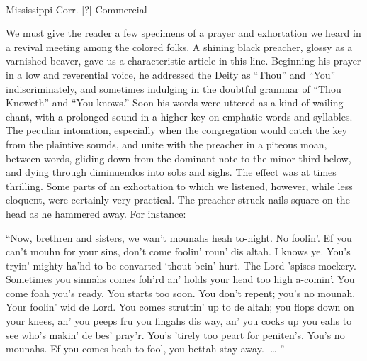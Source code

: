 \newpage
\begin{ipquote}
\begin{center}
\\
\end{center}
Mississippi Corr. [?] Commercial

We must give the reader a few specimens of a prayer and exhortation we heard in a revival meeting among the colored folks. A shining black preacher, glossy as a varnished beaver, gave us a characteristic article in this line. Beginning his prayer in a low and reverential voice, he addressed the Deity as “Thou” and “You” indiscriminately, and sometimes indulging in the doubtful grammar of “Thou Knoweth” and “You knows.” Soon his words were uttered as a kind of wailing chant, with a prolonged sound in a higher key on emphatic words and syllables. The peculiar intonation, especially when the congregation would catch the key from the plaintive sounds, and unite with the preacher in a piteous moan, between words, gliding down from the dominant note to the minor third below, and dying through diminuendos into sobs and sighs. The effect was at times thrilling. Some parts of an exhortation to which we listened, however, while less eloquent, were certainly very practical. The preacher struck nails square on the head as he hammered away. For instance:

“Now, brethren and sisters, we wan’t mounahs heah to-night. No foolin’. Ef you can’t mouhn for your sins, don’t come foolin’ roun’ dis altah. I knows ye. You’s tryin’ mighty ha’hd to be convarted ‘thout bein’ hurt. The Lord ’spises mockery. Sometimes you sinnahs comes foh’rd an’ holds your head too high a-comin’. You come foah you’s ready. You starts too soon. You don’t repent; you’s no mounah. Your foolin’ wid de Lord. You comes struttin’ up to de altah; you flops down on your knees, an’ you peeps fru you fingahs dis way, an’ you cocks up you eahs to see who’s makin’ de bes’ pray’r. You’s ’tirely too peart for peniten’s. You’s no mounahs. Ef you comes heah to fool, you bettah stay away. […]”
\end{ipquote}

